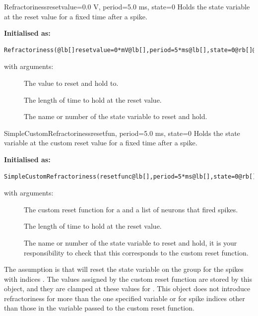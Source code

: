 \documentclass[letterpaper,10pt]{manual}
\begin{document}
\hypertarget{brian.Refractoriness}{}\begin{classdesc}{Refractoriness}{resetvalue=0.0 V, period=5.0 ms, state=0}
Holds the state variable at the reset value for a fixed time after a spike.

\textbf{Initialised as:}

\begin{Verbatim}[commandchars=@\[\]]
Refractoriness(@lb[]resetvalue=0*mV@lb[],period=5*ms@lb[],state=0@rb[]@rb[]@rb[])
\end{Verbatim}

with arguments:
\begin{description}
\item[]
The value to reset and hold to.

\item[]
The length of time to hold at the reset value.

\item[]
The name or number of the state variable to reset and hold.

\end{description}
\end{classdesc}


\hypertarget{brian.SimpleCustomRefractoriness}{}\begin{classdesc}{SimpleCustomRefractoriness}{resetfun, period=5.0 ms, state=0}
Holds the state variable at the custom reset value for a fixed time after a spike.

\textbf{Initialised as:}

\begin{Verbatim}[commandchars=@\[\]]
SimpleCustomRefractoriness(resetfunc@lb[],period=5*ms@lb[],state=0@rb[]@rb[])
\end{Verbatim}

with arguments:
\begin{description}
\item[]
The custom reset function  for  a
\hyperlink{brian.NeuronGroup}{} and  a list of neurons that
fired spikes.

\item[]
The length of time to hold at the reset value.

\item[]
The name or number of the state variable to reset and hold,
it is your responsibility to check that this corresponds to
the custom reset function.

\end{description}

The assumption is that  will reset the state
variable  on the group  for the spikes with indices
. The values assigned by the custom reset function are
stored by this object, and they are clamped at these values for
. This object does not introduce refractoriness for more
than the one specified variable  or for spike indices
other than those in the variable  passed to the custom
reset function.
\end{classdesc}
\end{document}

